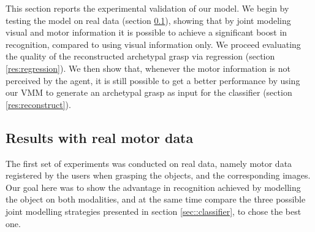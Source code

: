 This section reports the experimental validation of our model.
We begin by 
testing the model on real data (section \ref{res:real}), showing that
by joint modeling visual and motor information it is possible to
achieve a significant boost in recognition, compared to using visual
information only. 
We proceed evaluating the quality of the reconstructed archetypal grasp via regression
(section \ref{res:regression}).
We then show that, whenever the motor information
is not perceived by the agent, it is still possible to get a better performance
by using our VMM to generate an archetypal grasp as input for the classifier
(section \ref{res:reconstruct}).






\subsection{Results with real motor data}
\label{res:real}

The first set of experiments was conducted on real data, namely motor data
registered by the users when grasping the objects, and the corresponding images.
Our goal here was to show the advantage in recognition achieved by modelling the object
on both modalities, and at the same time compare the three possible joint
modelling strategies presented in section \ref{sec::classifier}, to chose the best one.

